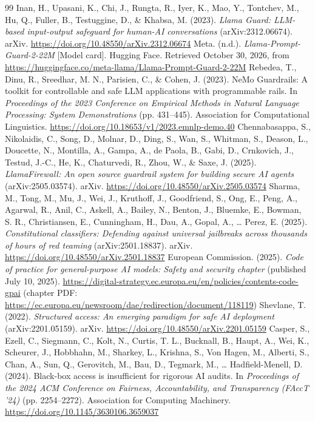 \documentclass[11pt]{article}
\begin{document}
\begin{thebibliography}{99}
 Inan, H., Upasani, K., Chi, J., Rungta, R., Iyer, K., Mao, Y., Tontchev, M., Hu, Q., Fuller, B., Testuggine, D., \& Khabsa, M. (2023). \emph{Llama Guard: LLM-based input-output safeguard for human-AI conversations} (arXiv:2312.06674). arXiv. \url{https://doi.org/10.48550/arXiv.2312.06674}
 Meta. (n.d.). \emph{Llama-Prompt-Guard-2-22M} [Model card]. Hugging Face. Retrieved October 30, 2026, from \url{https://huggingface.co/meta-llama/Llama-Prompt-Guard-2-22M}
 Rebedea, T., Dinu, R., Sreedhar, M. N., Parisien, C., \& Cohen, J. (2023). NeMo Guardrails: A toolkit for controllable and safe LLM applications with programmable rails. In \emph{Proceedings of the 2023 Conference on Empirical Methods in Natural Language Processing: System Demonstrations} (pp. 431--445). Association for Computational Linguistics. \url{https://doi.org/10.18653/v1/2023.emnlp-demo.40}
 Chennabasappa, S., Nikolaidis, C., Song, D., Molnar, D., Ding, S., Wan, S., Whitman, S., Deason, L., Doucette, N., Montilla, A., Gampa, A., de Paola, B., Gabi, D., Crnkovich, J., Testud, J.-C., He, K., Chaturvedi, R., Zhou, W., \& Saxe, J. (2025). \emph{LlamaFirewall: An open source guardrail system for building secure AI agents} (arXiv:2505.03574). arXiv. \url{https://doi.org/10.48550/arXiv.2505.03574}
 Sharma, M., Tong, M., Mu, J., Wei, J., Kruthoff, J., Goodfriend, S., Ong, E., Peng, A., Agarwal, R., Anil, C., Askell, A., Bailey, N., Benton, J., Bluemke, E., Bowman, S. R., Christiansen, E., Cunningham, H., Dau, A., Gopal, A., … Perez, E. (2025). \emph{Constitutional classifiers: Defending against universal jailbreaks across thousands of hours of red teaming} (arXiv:2501.18837). arXiv. \url{https://doi.org/10.48550/arXiv.2501.18837}
 European Commission. (2025). \emph{Code of practice for general-purpose AI models: Safety and security chapter} (published July 10, 2025). \url{https://digital-strategy.ec.europa.eu/en/policies/contents-code-gpai} (chapter PDF: \url{https://ec.europa.eu/newsroom/dae/redirection/document/118119})
 Shevlane, T. (2022). \emph{Structured access: An emerging paradigm for safe AI deployment} (arXiv:2201.05159). arXiv. \url{https://doi.org/10.48550/arXiv.2201.05159}
 Casper, S., Ezell, C., Siegmann, C., Kolt, N., Curtis, T. L., Bucknall, B., Haupt, A., Wei, K., Scheurer, J., Hobbhahn, M., Sharkey, L., Krishna, S., Von Hagen, M., Alberti, S., Chan, A., Sun, Q., Gerovitch, M., Bau, D., Tegmark, M., … Hadfield-Menell, D. (2024). Black-box access is insufficient for rigorous AI audits. In \emph{Proceedings of the 2024 ACM Conference on Fairness, Accountability, and Transparency (FAccT '24)} (pp. 2254--2272). Association for Computing Machinery. \url{https://doi.org/10.1145/3630106.3659037}

\end{thebibliography}
\end{document}
